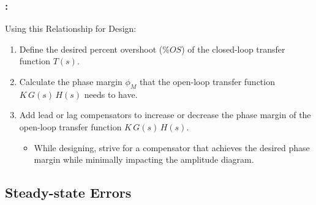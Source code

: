 \documentclass[ 10pt, xcolor = dvipsnames]{beamer}
\begin{document}
\begin{frame}[allowframebreaks]
\frametitle{\insertsection: \insertsubsection}

Using this Relationship for Design: 
\begin{enumerate}
\item Define the desired percent overshoot ($\% OS$) of the closed-loop \linebreak transfer function $T(s)$. 
\item Calculate the phase margin $\phi_M$ that the open-loop transfer function $K \, G(s) \, H(s)$ needs to have. 
\item Add lead or lag compensators to increase or decrease the phase margin \linebreak of the open-loop transfer function $K \, G(s) \, H(s)$. 
\begin{itemize}
\item While designing, strive for a compensator that achieves the desired \linebreak phase margin while minimally impacting the amplitude diagram. 
\end{itemize}

\end{enumerate}

\end{frame}

\subsection{Steady-state Errors}
\end{document}
